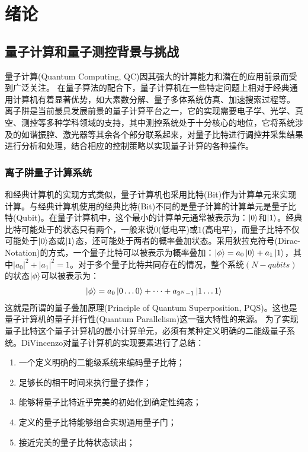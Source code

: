 
\chapter[绪论]{绪论\label{section:introduction}}
\section[离子阱量子测控背景与挑战]{量子计算和量子测控背景与挑战}
量子计算(Quantum Computing, QC)因其强大的计算能力和潜在的应用前景而受到广泛关注。
在量子算法的配合下，量子计算机在一些特定问题上相对于经典通用计算机有着显著优势，如大素数分解\cite[]{Shor_1997, Singleton_Jr_2023}、量子多体系统仿真\cite[]{Feynman_1982, Lloyd_1996}、加速搜索过程\cite[]{Grover_2002}等。
离子阱是当前最具发展前景的量子计算平台之一，它的实现需要电子学、光学、真空、测控等多种学科领域的支持，其中测控系统处于十分核心的地位，它将系统涉及的如谐振腔、激光器等其余各个部分联系起来，对量子比特进行调控并采集结果进行分析和处理，结合相应的控制策略以实现量子计算的各种操作。
\subsection[离子阱量子计算系统]{离子阱量子计算系统}
和经典计算机的实现方式类似，量子计算机也采用比特(Bit)作为计算单元来实现计算。与经典计算机使用的经典比特(Bit)不同的是量子计算的计算单元是量子比特(Qubit)。在量子计算机中，这个最小的计算单元通常被表示为：$\ket{0}$和$\ket{1}$。经典比特可能处于的状态只有两个，一般来说$0$(低电平)或$1$(高电平)，而量子比特不仅可能处于$\ket{0}$态或$\ket{1}$态，还可能处于两者的概率叠加状态。采用狄拉克符号(Dirac-Notation)的方式，一个量子比特可以被表示为概率叠加：$\ket{\phi}=a_0\ket{0}+a_1\ket{1}$，其中$|a_0|^2+|a_1|^2=1$。对于多个量子比特共同存在的情况，整个系统$(N-qubits)$的状态$\ket{\phi}$可以被表示为：
\begin{align}
    \ket{\phi}=a_0\ket{0\dots0}+\dots+a_{2^N-1}\ket{1\dots1}
\end{align}
这就是所谓的量子叠加原理(Principle of Quantum Superposition, PQS)\cite[]{Fedorov_Manko_2019}。这也是量子计算机的量子并行性(Quantum Parallelism)这一强大特性的来源。
为了实现量子比特这个量子计算机的最小计算单元，必须有某种定义明确的二能级量子系统。DiVincenzo对量子计算机的实现要素进行了总结\cite[]{DiVincenzo_2000}：
\begin{enumerate}
    \item 一个定义明确的二能级系统来编码量子比特；
    \item 足够长的相干时间来执行量子操作；
    \item 能够将量子比特近乎完美的初始化到确定性纯态；
    \item 定义的量子比特能够组合实现通用量子门；
    \item 接近完美的量子比特状态读出；
\end{enumerate}

